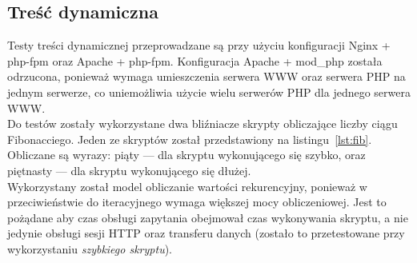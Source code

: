 \subsection{Treść dynamiczna}
Testy treści dynamicznej przeprowadzane są przy użyciu konfiguracji Nginx + php-fpm oraz Apache + php-fpm.
Konfiguracja Apache + mod\_php została odrzucona, ponieważ wymaga umieszczenia serwera WWW oraz serwera PHP na jednym serwerze, co uniemożliwia użycie wielu serwerów PHP dla jednego serwera WWW.\\
Do testów zostały wykorzystane dwa bliźniacze skrypty obliczające liczby ciągu Fibonacciego.
Jeden ze skryptów został przedstawiony na listingu~\ref{lst:fib}.
Obliczane są wyrazy: piąty --- dla skryptu wykonującego się szybko, oraz piętnasty --- dla skryptu wykonującego się dłużej.\\
Wykorzystany został model obliczanie wartości rekurencyjny, ponieważ w przeciwieństwie do iteracyjnego wymaga większej mocy obliczeniowej.
Jest to pożądane aby czas obsługi zapytania obejmował czas wykonywania skryptu, a nie jedynie obsługi sesji HTTP oraz transferu danych (zostało to przetestowane przy wykorzystaniu \textit{szybkiego skryptu}).

